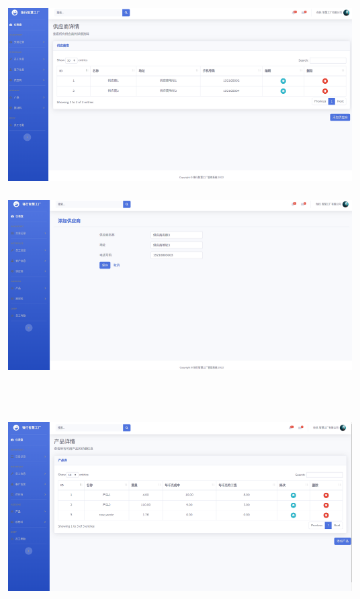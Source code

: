 \begin{figure}[H]
    \centering
    \begin{subfigure}{.35\textwidth}
        \centering
        \includegraphics[width=\textwidth]{figures/6viewallsupplier.png}
    \end{subfigure}
    \qquad
    \begin{subfigure}{.35\textwidth}
        \centering
        \includegraphics[width=\textwidth]{figures/6addnewsupplier.png}
    \end{subfigure}
    \\
    \begin{subfigure}{.35\textwidth}
        \centering
        \includegraphics[width=\textwidth]{figures/6viewallproduct.png}

\end{subfigure}
\end{figure}
